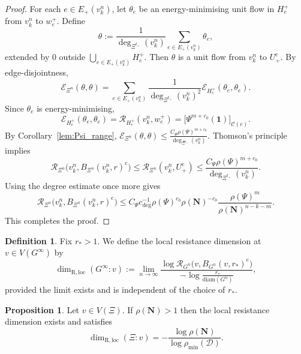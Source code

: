 \documentclass{article}
\theoremstyle{plain}
\theoremstyle{definition}
\newtheorem{definition}[theorem]{Definition}
\newtheorem{proposition}[theorem]{Proposition}
\newcommand{\diam}{\mathrm{diam}}
\newcommand{\Reff}{\mathscr{R}}
\begin{document}
\begin{proof}
For each $e\in E_+(v_k^n)$, let $\theta_e$ be an energy-minimising unit flow in $H_e^+$ from $v_k^n$ to $w_e^+$.
Define
\[
\theta:=\frac{1}{\deg_{\Xi^{t_+}}(v_k^n)}\sum_{e\in E_+(v_k^n)} \theta_e,
\]
extended by $0$ outside $\bigcup_{e\in E_+(v_k^n)} H_e^+$.
Then $\theta$ is a unit flow from $v_k^n$ to $U_+^{\mathrm c}$.
By edge-disjointness,
\[
\mathcal E_{\Xi^n}(\theta,\theta)
=
\sum_{e\in E_+(v_k^n)}
\frac{1}{\deg_{\Xi^{t_+}}(v_k^n)^2}
\mathcal E_{H_e^+}(\theta_e,\theta_e).
\]
Since $\theta_e$ is energy-minimising,
\[
\mathcal E_{H_e^+}(\theta_e,\theta_e)
=
\Reff_{H_e^+}(v_k^n,w_e^+)
=
\big[\Psi^{m+c_0}(\mathbf 1)\big]_{\mathscr C(e)}.
\]
By Corollary~\ref{lem:Psi_range},
$
\mathcal E_{\Xi^n}(\theta,\theta)
\le
\frac{C_{\Psi}\rho(\Psi)^{m+c_0}}{\deg_{\Xi^{t_+}}(v_k^n)}.
$
Thomson's principle implies
\[
\Reff_{\Xi^n}\bigl(v_k^n,B_{\Xi^n}(v_k^n,r)^{\mathrm c}\bigr)
\le
\Reff_{\Xi^n}(v_k^n,U_+^{\mathrm c})
\le
\frac{C_{\Psi}\rho(\Psi)^{m+c_0}}{\deg_{\Xi^{t_+}}(v_k^n)}.
\]
Using the degree estimate once more gives
\[
\Reff_{\Xi^n}\bigl(v_k^n,B_{\Xi^n}(v_k^n,r)^{\mathrm c}\bigr)
\le
C_{\Psi} c_{\deg}^{-1}\rho(\Psi)^{c_0}\rho(\mathbf N)^{-c_0}
\frac{\rho(\Psi)^m}{\rho(\mathbf N)^{n-k-m}}.
\]
This completes the proof.
\end{proof}

\begin{definition}\label{def:local_resistance_dimension}
Fix $r_*>1$.
We define the local resistance dimension at $v\in V(G^\infty)$ by
\[
\dim_{\mathrm{R,loc}}(G^\infty:v)
:=
\lim_{n\to\infty}
\frac{\log \Reff_{G^n}\bigl(v,B_{G^n}(v,r_*)^{\mathrm c}\bigr)}
{-\log\frac{r_*}{\diam(G^n)}},
\]
provided the limit exists and is independent of the choice of $r_*$.
\end{definition}

\begin{proposition}\label{prop:local_resistance_dimension_k_born}
Let $v\in V(\Xi)$.
If $\rho(\mathbf N)>1$ then the local resistance dimension exists and satisfies
\[
\dim_{\mathrm{R,loc}}(\Xi:v)
=
-\frac{\log \rho(\mathbf N)}{\log \rho_{\min}(\mathcal D)}.
\]
\end{proposition}
\end{document}
